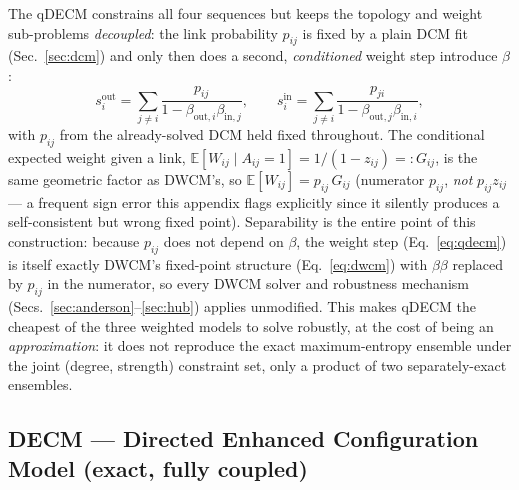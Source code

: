 \documentclass[10pt]{article}
\begin{document}
The qDECM constrains all four sequences but keeps the topology and weight
sub-problems \emph{decoupled}: the link probability $p_{ij}$ is fixed by a
plain DCM fit (Sec.~\ref{sec:dcm}) and only then does a second,
\emph{conditioned} weight step introduce $\beta$:
\begin{equation}
\label{eq:qdecm}
s^{\mathrm{out}}_i = \sum_{j\ne i} \frac{p_{ij}}{1-\beta_{\mathrm{out},i}\beta_{\mathrm{in},j}}, \qquad
s^{\mathrm{in}}_i = \sum_{j\ne i} \frac{p_{ji}}{1-\beta_{\mathrm{out},j}\beta_{\mathrm{in},i}},
\end{equation}
with $p_{ij}$ from the already-solved DCM held fixed throughout. The
conditional expected weight given a link, $\mathbb E[W_{ij}\mid A_{ij}=1] =
1/(1-z_{ij})=:G_{ij}$, is the same geometric factor as DWCM's, so
$\mathbb E[W_{ij}]=p_{ij}\,G_{ij}$ (numerator $p_{ij}$, \emph{not}
$p_{ij}z_{ij}$ --- a frequent sign error this appendix flags explicitly
since it silently produces a self-consistent but wrong fixed point).
Separability is the entire point of this construction: because $p_{ij}$
does not depend on $\beta$, the weight step (Eq.~\ref{eq:qdecm}) is itself
exactly DWCM's fixed-point structure (Eq.~\ref{eq:dwcm}) with $\beta\beta$
replaced by $p_{ij}$ in the numerator, so every DWCM solver and robustness
mechanism (Secs.~\ref{sec:anderson}--\ref{sec:hub}) applies unmodified. This
makes qDECM the cheapest of the three weighted models to solve robustly,
at the cost of being an \emph{approximation}: it does not reproduce the
exact maximum-entropy ensemble under the joint (degree, strength)
constraint set, only a product of two separately-exact ensembles.

\subsection{DECM --- Directed Enhanced Configuration Model (exact, fully coupled)}
\label{sec:decm}
\end{document}
